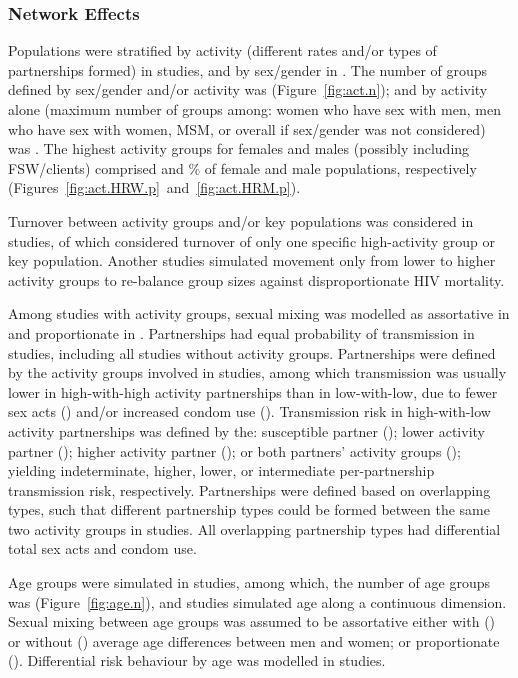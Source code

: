 \subsubsection{Network Effects}
\label{sss:res:network}
Populations were stratified by activity (different rates and/or types of partnerships formed)
in  studies, and by sex/gender in .
The number of groups defined by sex/gender and/or activity was   (Figure~\ref{fig:act.n});
and by activity alone (maximum number of groups among:
women who have sex with men, men who have sex with women,
MSM, or overall if sex/gender was not considered) was .
The highest activity groups for females and males (possibly including FSW/clients) comprised
 and \% of female and male populations, respectively
(Figures~\ref{fig:act.HRW.p}~and~\ref{fig:act.HRM.p}).
\par
Turnover between activity groups and/or key populations
was considered in  studies,
of which  considered turnover of only
one specific high-activity group or key population.
Another  studies simulated
movement only from lower to higher activity groups
to re-balance group sizes against disproportionate HIV mortality.
\par
Among  studies with activity groups, sexual mixing was modelled as
assortative in  and proportionate in .
Partnerships had equal probability of transmission in  studies,
including all studies without activity groups.
Partnerships were defined by the activity groups involved in  studies,
among which transmission was usually
lower in high-with-high activity partnerships than in low-with-low, due to
fewer sex acts () and/or increased condom use ().
Transmission risk in high-with-low activity partnerships was defined by the:
susceptible partner ();
lower activity partner ();
higher activity partner (); or
both partners' activity groups ();
yielding indeterminate, higher, lower, or intermediate
per-partnership transmission risk, respectively.
Partnerships were defined based on overlapping types, such that
different partnership types could be formed between the same two activity groups in  studies.
All overlapping partnership types had differential total sex acts and condom use.
\par
Age groups were simulated in  studies, among which,
the number of age groups was  (Figure~\ref{fig:age.n}),
and  studies simulated age along a continuous dimension.
Sexual mixing between age groups was assumed to be assortative
either with () or without ()
average age differences between men and women;
or proportionate ().
Differential risk behaviour by age was modelled in  studies.
